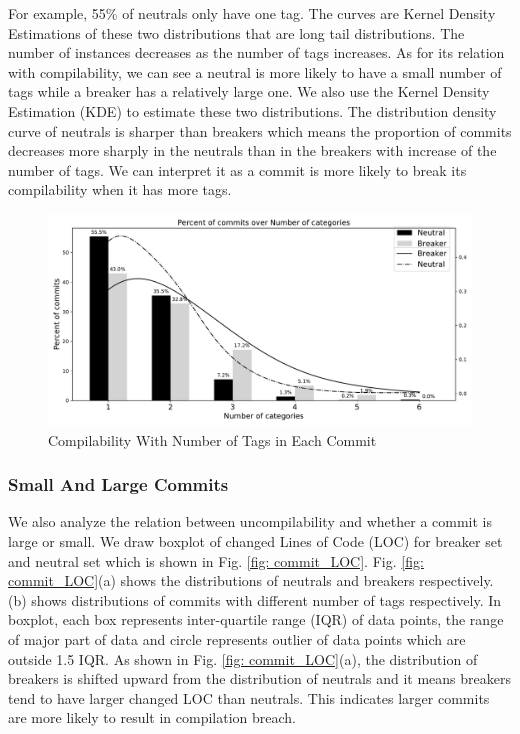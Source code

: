 For example, 55\% of neutral{}s only have one tag. 
The curves are Kernel Density Estimations of these two distributions that are long tail distributions. 
The number of instances decreases as the number of tags increases.
As for its relation with compilability, we can see a neutral is more likely to have a small number of tags while a breaker has a relatively large one. 
We also use the Kernel Density Estimation (KDE) to estimate these two distributions. 
The distribution density curve of neutral{}s is sharper than breaker{}s which means the proportion of commits decreases more sharply in the neutral{}s than in the breaker{}s with increase of the number of tags. 
We can interpret it as a commit is more likely to break its compilability when it has more tags.

\begin{figure}[htbp]
\centerline{\includegraphics[scale=0.6]{figures/num_tasks_break_rate.pdf}}
\caption{Compilability With Number of Tags in Each Commit}
\label{fig:num_tasks_fig}
\end{figure}



\subsubsection{Small And Large Commits}

We also analyze the relation between uncompilability and whether a commit is large or small. 
We draw boxplot of changed Lines of Code (LOC) for breaker set and neutral set which is shown in Fig. \ref{fig: commit_LOC}.
Fig. \ref{fig: commit_LOC}(a) shows the distributions of neutrals and breakers respectively. 
(b) shows distributions of commits with different number of tags respectively. 
In boxplot, each box represents inter-quartile range (IQR) of data points, the range of major part of data and circle represents outlier of data points which are outside 1.5 IQR.
As shown in Fig. \ref{fig: commit_LOC}(a), the distribution of breaker{}s is shifted upward from the distribution of neutral{}s and it means breaker{}s tend to have larger changed LOC than neutral{}s. 
This indicates larger commits are more likely to result in compilation breach.

